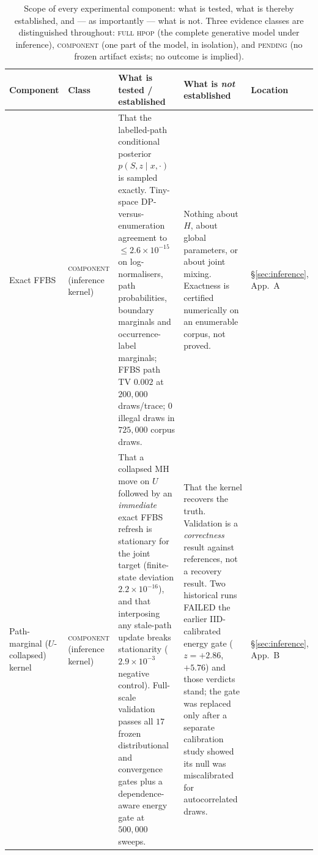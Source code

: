 %

\begin{table}[p]
\centering
\footnotesize
\renewcommand{\arraystretch}{1.25}
\caption{%
Scope of every experimental component: what is tested, what is thereby
established, and --- as importantly --- what is not. Three evidence classes are
distinguished throughout: \textsc{full hpop} (the complete generative model
under inference), \textsc{component} (one part of the model, in isolation), and
\textsc{pending} (no frozen artifact exists; no outcome is implied).%
}
\label{tab:claim-scope}
\begin{tabularx}{\textwidth}{@{}l l X X l@{}}
\toprule
Component & Class & What is tested / established & What is \emph{not} established & Location \\
\midrule

Exact FFBS
& \textsc{component} \newline (inference kernel)
& That the labelled-path conditional posterior $p(S, z \mid x, \cdot)$ is
  sampled exactly. Tiny-space DP-versus-enumeration agreement to
  $\leq 2.6\times10^{-15}$ on log-normalisers, path probabilities, boundary
  marginals and occurrence-label marginals; FFBS path TV $0.002$ at
  $200{,}000$ draws/trace; $0$ illegal draws in $725{,}000$ corpus draws.
& Nothing about $H$, about global parameters, or about joint mixing. Exactness
  is certified numerically on an enumerable corpus, not proved.
& \S\ref{sec:inference}, App.~A \\

Path-marginal ($U$-collapsed) kernel
& \textsc{component} \newline (inference kernel)
& That a collapsed MH move on $U$ followed by an \emph{immediate} exact FFBS
  refresh is stationary for the joint target (finite-state deviation
  $2.2\times10^{-16}$), and that interposing any stale-path update breaks
  stationarity ($2.9\times10^{-3}$ negative control). Full-scale validation
  passes all $17$ frozen distributional and convergence gates plus a
  dependence-aware energy gate at $500{,}000$ sweeps.
& That the kernel recovers the truth. Validation is a \emph{correctness}
  result against references, not a recovery result. Two historical runs FAILED
  the earlier IID-calibrated energy gate ($z = +2.86$, $+5.76$) and those
  verdicts stand; the gate was replaced only after a separate calibration study
  showed its null was miscalibrated for autocorrelated draws.
& \S\ref{sec:inference}, App.~B \\


\end{tabularx}
\end{table}
